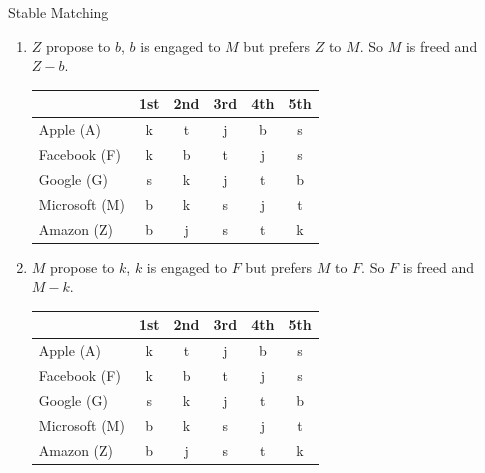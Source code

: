 \documentclass{article}
\numberwithin{table}{section}
\numberwithin{figure}{section}
\begin{document}
\begin{section}{Stable Matching}
\begin{enumerate} [(A)]
\begin{enumerate}[(1)]
\begin{tcolorbox}[breakable]
\begin{enumerate}[(1)]
                    \item $Z$ propose to $b$, $b$ is engaged to $M$ but prefers $Z$ to $M$. So $M$ is freed and $Z-b$.
                    \begin{table}[H]
                        \centering
                        \begin{tabular}{|m{2.5cm}|*{5}{c|}}
                            \hline
                            & 1st & 2nd & 3rd & 4th & 5th \\
                            \hline
                            Apple (A)        & {\color{blue} k} & {\color{red} t} & j & b & s \\
                            Facebook (F)     & {\color{red} k} & b & t & j & s \\
                            Google (G)       & {\color{red} s} & k & j & t & b \\
                            Microsoft (M)    & {\color{blue} b} & k & s & j & t \\
                            Amazon (Z)       & {\color{red} b} & j & s & t & k \\
                            \hline                            
                        \end{tabular}
                    \end{table}     

                    \item $M$ propose to $k$, $k$ is engaged to $F$ but prefers $M$ to $F$. So $F$ is freed and $M-k$.
                    \begin{table}[H]
                        \centering
                        \begin{tabular}{|m{2.5cm}|*{5}{c|}}
                            \hline
                            & 1st & 2nd & 3rd & 4th & 5th \\
                            \hline
                            Apple (A)        & {\color{blue} k} & {\color{red} t} & j & b & s \\
                            Facebook (F)     & {\color{blue} k} & b & t & j & s \\
                            Google (G)       & {\color{red} s} & k & j & t & b \\
                            Microsoft (M)    & {\color{blue} b} & {\color{red} k} & s & j & t \\
                            Amazon (Z)       & {\color{red} b} & j & s & t & k \\
                            \hline                            
                        \end{tabular}
                    \end{table}                 
                       

\end{enumerate}
\end{tcolorbox}
\end{enumerate}
\end{enumerate}
\end{section}
\end{document}
